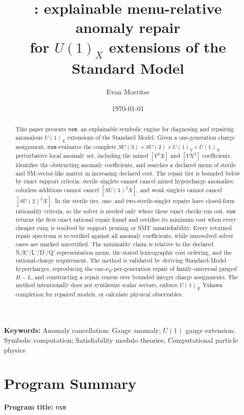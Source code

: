 \documentclass[11pt]{article}
\title{\nsm: explainable menu-relative anomaly repair\\
for $U(1)_X$ extensions of the Standard Model}
\author{Evan Morritse}
\date{\today}
\newcommand{\nsm}{\texttt{nsm}}
\newcommand{\UX}{U(1)_X}
\newcommand{\SUthree}{SU(3)}
\newcommand{\SUtwo}{SU(2)}
\begin{document}
\maketitle

\begin{abstract}
This paper presents \nsm, an explainable symbolic engine for diagnosing and repairing
anomalous $U(1)_X$ extensions of the Standard Model. Given a one-generation
charge assignment, \nsm{} evaluates the complete
$SU(3)\times SU(2)\times U(1)_Y\times U(1)_X$ perturbative local anomaly set,
including the mixed $[Y^2X]$ and $[YX^2]$ coefficients, identifies the
obstructing anomaly coefficients, and searches a declared menu of sterile and
SM-vector-like matter in increasing declared cost. The repair tier is
bounded below by exact support criteria: sterile singlets cannot cancel mixed hypercharge
anomalies, colorless additions cannot cancel $[\SUthree^2X]$, and weak singlets
cannot cancel $[\SUtwo^2X]$. In the sterile tier, one- and two-sterile-singlet
repairs have closed-form rationality criteria, so the solver is needed only where these exact
checks run out. \nsm{} returns the first exact rational repair found and certifies
its minimum cost when every cheaper rung is resolved by support pruning or SMT
unsatisfiability. Every returned repair spectrum is re-verified against all
anomaly coefficients, while unresolved solver cases are marked uncertified. The
minimality claim is relative to the declared N/E'/L'/D'/Q' representation menu,
the stated lexicographic cost ordering, and the rational-charge requirement. The
method is validated by deriving Standard-Model hypercharges, reproducing the
one-$\nu_R$-per-generation repair of family-universal gauged $B\!-\!L$, and
constructing a repair census over bounded integer charge assignments. The method
intentionally does not synthesize scalar sectors, enforce $\UX$ Yukawa
completion for repaired models, or calculate physical observables.
\end{abstract}

\noindent\textbf{Keywords:} Anomaly cancellation; Gauge anomaly; \(U(1)\) gauge extension; Symbolic computation; Satisfiability modulo theories; Computational particle physics

\section*{Program Summary}

\noindent
\textbf{Program title:} \texttt{nsm}
\end{document}
